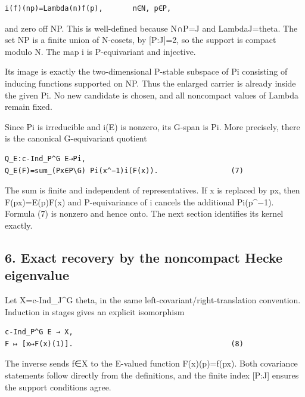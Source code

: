 \begin{Verbatim}[fontsize=\small,breaklines=true,breakanywhere=true]
i(f)(np)=Lambda(n)f(p),       n∈N, p∈P,
\end{Verbatim}

and zero off NP. This is well-defined because N∩P=J and
Lambda\textbar J=theta. The set NP is a finite union of N-cosets, by
{[}P:J{]}=2, so the support is compact modulo N. The map i is
P-equivariant and injective.

Its image is exactly the two-dimensional P-stable subspace of Pi
consisting of inducing functions supported on NP. Thus the enlarged
carrier is already inside the given Pi. No new candidate is chosen, and
all noncompact values of Lambda remain fixed.

Since Pi is irreducible and i(E) is nonzero, its G-span is Pi. More
precisely, there is the canonical G-equivariant quotient

\begin{Verbatim}[fontsize=\small,breaklines=true,breakanywhere=true]
Q_E:c-Ind_P^G E→Pi,
Q_E(F)=sum_(Px∈P\G) Pi(x^−1)i(F(x)).                 (7)
\end{Verbatim}

The sum is finite and independent of representatives. If x is replaced
by px, then F(px)=E(p)F(x) and P-equivariance of i cancels the
additional Pi(p\^{}−1). Formula (7) is nonzero and hence onto. The next
section identifies its kernel exactly.

\hypertarget{rank2-exact-recovery-by-the-noncompact-hecke-eigenvalue}{%
\subsection{6. Exact recovery by the noncompact Hecke
eigenvalue}\label{rank2-exact-recovery-by-the-noncompact-hecke-eigenvalue}}

Let X=c-Ind\_J\^{}G theta, in the same left-covariant/right-translation
convention. Induction in stages gives an explicit isomorphism

\begin{Verbatim}[fontsize=\small,breaklines=true,breakanywhere=true]
c-Ind_P^G E → X,
F ↦ [x↦F(x)(1)].                                     (8)
\end{Verbatim}

The inverse sends f∈X to the E-valued function F(x)(p)=f(px). Both
covariance statements follow directly from the definitions, and the
finite index {[}P:J{]} ensures the support conditions agree.

